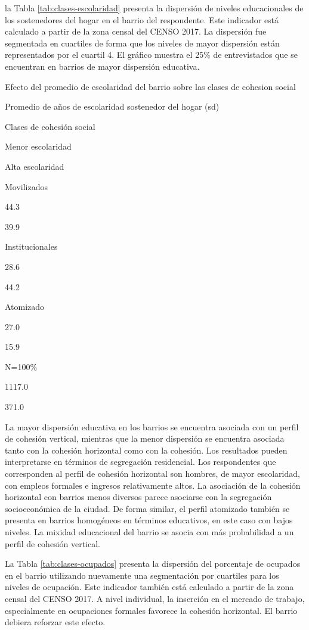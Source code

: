 \documentclass[
  12pt,
]{book}
\begin{document}
la Tabla \ref{tab:clases-escolaridad} presenta la dispersión de niveles educacionales de los sostenedores del hogar en el barrio del respondente. Este indicador está calculado a partir de la zona censal del CENSO 2017. La dispersión fue segmentada en cuartiles de forma que los niveles de mayor dispersión están representados por el cuartil 4. El gráfico muestra el 25\% de entrevistados que se encuentran en barrios de mayor dispersión educativa.

\label{tab:clases-escolaridad}Efecto del promedio de escolaridad del barrio sobre las clases de cohesion social

Promedio de años de escolaridad sostenedor del hogar (sd)

Clases de cohesión social

Menor escolaridad

Alta escolaridad

Movilizados

44.3

39.9

Institucionales

28.6

44.2

Atomizado

27.0

15.9

N=100\%

1117.0

371.0

La mayor dispersión educativa en los barrios se encuentra asociada con un perfil de cohesión vertical, mientras que la menor dispersión se encuentra asociada tanto con la cohesión horizontal como con la cohesión. Los resultados pueden interpretarse en términos de segregación residencial. Los respondentes que corresponden al perfil de cohesión horizontal son hombres, de mayor escolaridad, con empleos formales e ingresos relativamente altos. La asociación de la cohesión horizontal con barrios menos diversos parece asociarse con la segregación socioeconómica de la ciudad. De forma similar, el perfil atomizado también se presenta en barrios homogéneos en términos educativos, en este caso con bajos niveles. La mixidad educacional del barrio se asocia con más probabilidad a un perfil de cohesión vertical.

La Tabla \ref{tab:clases-ocupados} presenta la dispersión del porcentaje de ocupados en el barrio utilizando nuevamente una segmentación por cuartiles para los niveles de ocupación. Este indicador también está calculado a partir de la zona censal del CENSO 2017. A nivel individual, la inserción en el mercado de trabajo, especialmente en ocupaciones formales favorece la cohesión horizontal. El barrio debiera reforzar este efecto.
\end{document}
